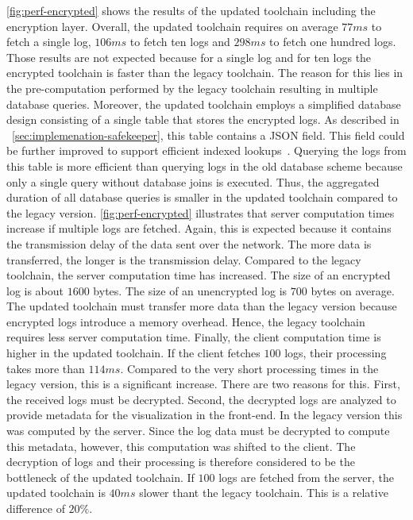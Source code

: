\documentclass[../main.tex]{subfiles}
\begin{document}
\cref{fig:perf-encrypted} shows the results of the updated toolchain including the encryption layer.
Overall, the updated toolchain requires on average $77ms$ to fetch a single log, $106ms$ to fetch ten logs and $298ms$ to fetch one hundred logs.
Those results are not expected because for a single log and for ten logs the encrypted toolchain is faster than the legacy toolchain.
The reason for this lies in the pre-computation performed by the legacy toolchain resulting in multiple database queries.
Moreover, the updated toolchain employs a simplified database design consisting of a single table that stores the encrypted logs.
As described in ~\cref{sec:implemenation-safekeeper}, this table contains a JSON field.
This field could be further improved to support efficient indexed lookups~\cite{Shang2021}.
Querying the logs from this table is more efficient than querying logs in the old database scheme because only a single query without database joins is executed.
Thus, the aggregated duration of all database queries is smaller in the updated toolchain compared to the legacy version.
\cref{fig:perf-encrypted} illustrates that server computation times increase if multiple logs are fetched.
Again, this is expected because it contains the transmission delay of the data sent over the network.
The more data is transferred, the longer is the transmission delay.
Compared to the legacy toolchain, the server computation time has increased.
The size of an encrypted log is about $1600$ bytes.
The size of an unencrypted log is $700$ bytes on average.
The updated toolchain must transfer more data than the legacy version because encrypted logs introduce a memory overhead.
Hence, the legacy toolchain requires less server computation time.
Finally, the client computation time is higher in the updated toolchain.
If the client fetches $100$ logs, their processing takes more than $114ms$.
Compared to the very short processing times in the legacy version, this is a significant increase.
There are two reasons for this.
First, the received logs must be decrypted.
Second, the decrypted logs are analyzed to provide metadata for the visualization in the front-end.
In the legacy version this was computed by the server.
Since the log data must be decrypted to compute this metadata, however, this computation was shifted to the client.
The decryption of logs and their processing is therefore considered to be the bottleneck of the updated toolchain.
If $100$ logs are fetched from the server, the updated toolchain is $40ms$ slower thant the legacy toolchain.
This is a relative difference of $20\%$.
\end{document}

